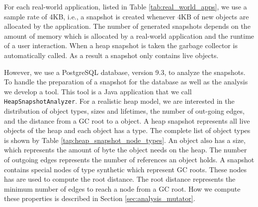 For each real-world application, listed in Table \ref{tab:real_world_apps}, we use a sample rate of 4KB, i.e., a snapshot is created whenever 4KB of new objects are allocated by the application. The number of generated snapshots depends on the amount of memory which is allocated by a real-world application and the runtime of a user interaction. When a heap snapshot is taken the garbage collector is automatically called. As a result a snapshot only contains live objects. 

However, we use a PostgreSQL \cite{PSQL} database, version 9.3, to analyze the snapshots. To handle the preparation of a snapshot for the database as well as the analysis we develop a tool. This tool is a Java application that we call \texttt{HeapSnapshotAnalyzer}. For a realistic heap model, we are interested in the distribution of object types, sizes and lifetimes, the number of out-going edges, and the distance from a GC root to a object. A heap snapshot represents all live objects of the \JS heap and each object has a type. The complete list of object types is shown by Table \ref{tap:heap_snapshot_node_types}. An object also has a size, which represents the amount of byte the object needs on the heap. The number of outgoing edges represents the number of references an object holds. A snapshot contains special nodes of type synthetic which represent GC roots. These nodes has are used to compute the root distance. The root distance represents the minimum number of edges to reach a node from a GC root. How we compute these properties is described in Section \ref{sec:analysis_mutator}.